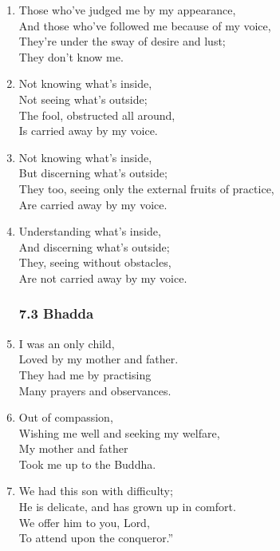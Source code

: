 \documentclass[10pt, openany]{book}
\newcommand*{\vleftofline}[1]{\leavevmode\llap{#1}}
\begin{document}
\begin{enumerate}
\item Those who’ve judged me by my appearance,\\
And those who’ve followed me because of my voice,\\
They’re under the sway of desire and lust;\\
They don’t know me.

\item Not knowing what’s inside,\\
Not seeing what’s outside;\\
The fool, obstructed all around,\\
Is carried away by my voice.

\item Not knowing what’s inside,\\
But discerning what’s outside;\\
They too, seeing only the external fruits of practice,\\
Are carried away by my voice.

\item Understanding what’s inside,\\
And discerning what’s outside;\\
They, seeing without obstacles,\\
Are not carried away by my voice.

\subsubsection*{7.3 Bhadda}

\item I was an only child,\\
Loved by my mother and father.\\
They had me by practising\\
Many prayers and observances.

\item Out of compassion,\\
Wishing me well and seeking my welfare,\\
My mother and father\\
Took me up to the Buddha.

\item \vleftofline{“}We had this son with difficulty;\\
He is delicate, and has grown up in comfort.\\
We offer him to you, Lord,\\
To attend upon the conqueror.”


\end{enumerate}
\end{document}
